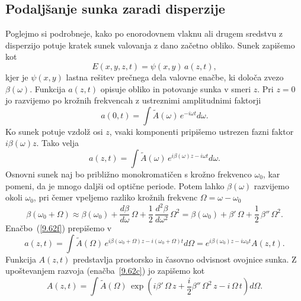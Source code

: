 \subsection*{Podaljšanje sunka zaradi disperzije}
Poglejmo si podrobneje, kako po enorodovnem vlaknu ali drugem
sredstvu z disperzijo potuje kratek sunek valovanja z dano začetno obliko.
Sunek zapišemo kot  
\begin{equation}
E\left(x, y, z, t\right)=\psi\left(x,y\right)\, a\left(z,t\right),
\label{9.61}
\end{equation}
kjer je $\psi\left(x,y\right)$ lastna rešitev prečnega dela valovne
enačbe, ki določa zvezo $\beta\left(\omega\right)$. 
Funkcija $a\left(z,t\right)$ opisuje obliko in potovanje sunka v smeri $z$. 
Pri $z=0$ jo razvijemo po krožnih frekvencah z ustreznimi amplitudnimi faktorji 
\begin{equation}
a\left(0,t\right)=\int \tilde{A}(\omega)\, e^{- i\omega t}d\omega.
\label{9.62}
\end{equation}
Ko sunek potuje vzdolž osi $z$, vsaki komponenti pripišemo
ustrezen fazni faktor $i \beta (\omega) z$. Tako velja
\begin{equation}
a\left(z,t\right)=\int \tilde{A}(\omega)\, e^{i \beta (\omega) z - i\omega t}d\omega.
\label{9.62f}
\end{equation}
Osnovni sunek naj bo približno monokromatičen s krožno frekvenco $\omega_{0}$,
kar pomeni, da je mnogo daljši od optične periode. Potem lahko $\beta(\omega)$
razvijemo okoli $\omega_{0}$, pri čemer vpeljemo razliko krožnih frekvenc $\Omega = \omega - \omega_0$
\begin{equation}
\beta(\omega_0 + \Omega) \approx \beta(\omega_{0})
+\frac{d\beta}{d\omega}\,\Omega+\frac{1}{2}\,\frac{d^{2}\beta}{d\omega^{2}}\,\Omega^{2} = 
\beta(\omega_{0}) +\beta '\,\Omega+\frac{1}{2}\,\beta ''\,\Omega^{2}.
\label{9.62c}
\end{equation}
Enačbo~(\ref{9.62f}) prepišemo v 
\begin{equation}
a\left(z,t\right)=\int \tilde{A}(\Omega)\, e^{i \beta (\omega_0 + \Omega)z - 
i(\omega_0 + \Omega) t}d\Omega  =  e^{i \beta (\omega_0)z - i\omega_0 t} A(z,t).
\label{9.62b}
\end{equation}
Funkcija $A(z, t)$ predstavlja prostorsko in časovno odvisnost ovojnice sunka. Z upoštevanjem
razvoja (enačba~\ref{9.62c}) jo zapišemo kot 
\begin{equation}
 A(z,t) = \int \tilde{A}(\Omega)\, \exp \left(i \beta'\, \Omega\,z + 
 \frac{i}{2}\beta''\,\Omega^2\, z - i\, \Omega\, t\right) d\Omega.
 \label{eq:ovojnica967}
\end{equation}

